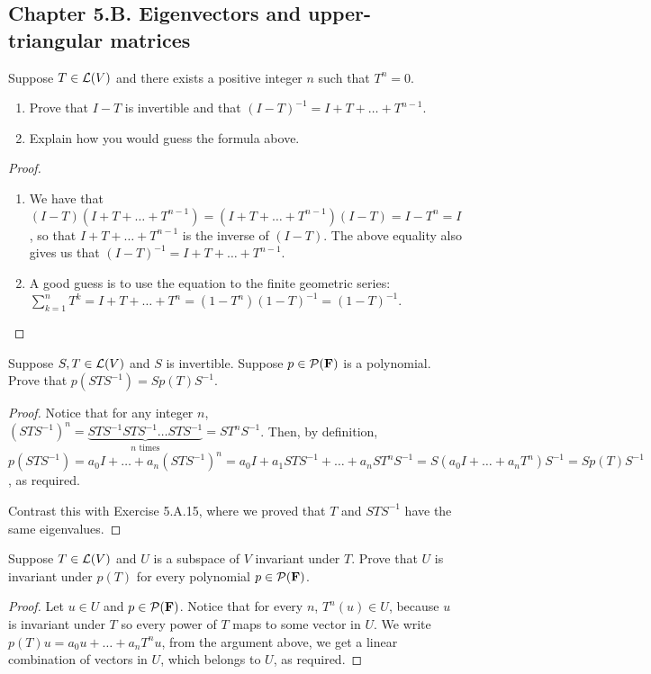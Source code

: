 \subsection*{Chapter 5.B. Eigenvectors and upper-triangular matrices}


\begin{exercise}{1}
  Suppose $T\in\mathcal{L}(V)$ and there exists a positive integer $n$ such that $T^n=0$.
  \begin{enumerate}
      \item Prove that $I-T$ is invertible and that $(I-T)^{-1}=I+T+\dots+T^{n-1}$.
      \item Explain how you would guess the formula above.
  \end{enumerate}
\end{exercise}
\begin{proof}
 \begin{enumerate}
     \item We have that $(I-T)(I+T+\dots+T^{n-1})= (I+T+\dots+T^{n-1})(I-T)= I-T^n= I$, so that $I+T+\dots+T^{n-1}$ is the inverse of $(I-T)$. The above equality also gives us that $(I-T)^{-1}=I+T+\dots+T^{n-1}$.
     \item A good guess is to use the equation to the finite geometric series: $\sum_{k=1}^n T^k= I+T+\dots+T^{n}= (1-T^n)(1-T)^{-1}= (1-T)^{-1}$.
 \end{enumerate}
\end{proof}

\begin{exercise}{5}
  Suppose $S,T\in\mathcal{L}(V)$ and $S$ is invertible. Suppose $p\in\mathcal{P}(\mathbf{F})$ is a polynomial. Prove that $p(STS^{-1})=Sp(T)S^{-1}$.
\end{exercise}
\begin{proof}
 Notice that for any integer $n$, $(STS^{-1})^n= \underbrace{STS^{-1}STS^{-1}\dots STS^{-1}}_{\text{$n$ times}}= ST^nS^{-1}$. Then, by definition, $p(STS^{-1})= a_0I+\dots+a_n(STS^{-1})^n= a_0I+a_1STS^{-1}+\dots+a_nST^nS^{-1}= S(a_0I+\dots+a_nT^n)S^{-1}= Sp(T)S^{-1}$, as required.

 Contrast this with Exercise 5.A.15, where we proved that $T$ and $STS^{-1}$ have the same eigenvalues.
\end{proof}

\begin{exercise}{6}
  Suppose $T\in\mathcal{L}(V)$ and $U$ is a subspace of $V$ invariant under $T$. Prove that $U$ is invariant under $p(T)$ for every polynomial $p\in\mathcal{P}(\mathbf{F})$.
\end{exercise}
\begin{proof}
 Let $u\in U$ and $p\in\mathcal{P}(\mathbf{F})$. Notice that for every $n$, $T^n(u)\in U$, because $u$ is invariant under $T$ so every power of $T$ maps to some vector in $U$. We write $p(T)u=a_0u+\dots+a_nT^nu$, from the argument above, we get a linear combination of vectors in $U$, which belongs to $U$, as required.
\end{proof}

